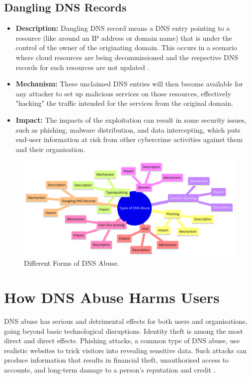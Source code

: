 \subsection{Dangling DNS Records}
\begin{itemize}
    \item \textbf{Description:} Dangling DNS record means a DNS entry pointing to a resource (like around an IP address or domain name) that is under the control of the owner of the originating domain. This occurs in a scenario where cloud resources are being decommissioned and the respective DNS records for such resources are not updated \cite{friess2024cloudy}.
    \item \textbf{Mechanism:} These unclaimed DNS entries will then become available for any attacker to set up malicious services on those resources, effectively "hacking" the traffic intended for the services from the original domain.
    \item \textbf{Impact:} The impacts of the exploitation can result in some security issues, such as phishing, malware distribution, and data intercepting, which puts end-user information at risk from other cybercrime activities against them and their organisation.
\end{itemize}


\captionsetup{font= footnotesize}
\begin{figure}[H]
\centering
\includegraphics[width=\textwidth]{background/dnsformstypes.png}
\caption{Different Forms of DNS Abuse.}
\label{fig:figureThree}
\end{figure}




\section{How DNS Abuse Harms Users}

DNS abuse has serious and detrimental effects for both users and organisations, going beyond basic technological disruptions. Identity theft is among the most direct and direct effects. Phishing attacks, a common type of DNS abuse, use realistic websites to trick visitors into revealing sensitive data. Such attacks can produce information that results in financial theft, unauthorised access to accounts, and long-term damage to a person's reputation and credit \cite{godaddy2023dnsabuse}.

